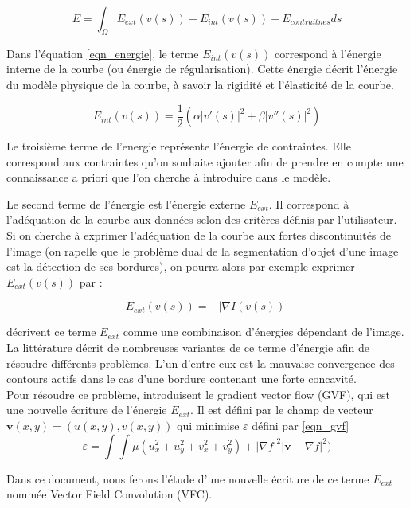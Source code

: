 \begin{equation}
E = \int_{\Omega}{E_{ext}(v(s)) + E_{int}(v(s)) + E_{contraitnes} ds}
\label{eqn_energie}
\end{equation}

Dans l'équation \ref{eqn_energie}, le terme $E_{int}(v(s))$ correspond à l'énergie interne de la courbe (ou énergie de régularisation). Cette énergie décrit l'énergie du modèle physique de la courbe, à savoir la rigidité et l'élasticité de la courbe.

\begin{equation}
E_{int}(v(s)) = \frac{1}{2}\left(\alpha|v'(s)|^{2}+\beta|v''(s)|^{2}\right)
\end{equation}

Le troisième terme de l'energie représente l'énergie de contraintes. Elle correspond aux contraintes qu'on souhaite ajouter afin de prendre en compte une connaissance a priori que l'on cherche à introduire dans le modèle.

Le second terme de l'énergie est l'énergie externe $E_{ext}$. Il correspond à l'adéquation de la courbe aux données selon des critères définis par l'utilisateur. Si on cherche à exprimer l'adéquation de la courbe aux fortes discontinuités de l'image (on rapelle que le problème dual de la segmentation d'objet d'une image est la détection de ses bordures), on pourra alors par exemple exprimer $E_{ext}(v(s))$ par :

\begin{equation}
E_{ext}(v(s)) = -|\nabla I(v(s))|
\end{equation}

\cite{kaas} décrivent ce terme $E_{ext}$ comme une combinaison d'énergies dépendant de l'image. La littérature décrit de nombreuses variantes de ce terme d'énergie afin de résoudre différents problèmes. L'un d'entre eux est la mauvaise convergence des contours actifs dans le cas d'une bordure contenant une forte concavité.\\

Pour résoudre ce problème, \cite{gvf} introduisent le gradient vector flow (GVF), qui est une nouvelle écriture de l'énergie $E_{ext}$. Il est défini par le champ de vecteur $\textbf{v}(x,y) = (u(x,y), v(x,y))$ qui minimise $\varepsilon$ défini par \ref{eqn_gvf}
\begin{equation}
\varepsilon = \int\int \mu(u_{x}^{2}+u_{y}^{2}+v_{x}^{2}+v_{y}^{2})+|\nabla f|^{2}|\textbf{v}-\nabla f|^{2})
\label{eqn_gvf}
\end{equation}

Dans ce document, nous ferons l'étude d'une nouvelle écriture de ce terme $E_{ext}$ nommée Vector Field Convolution (VFC).
